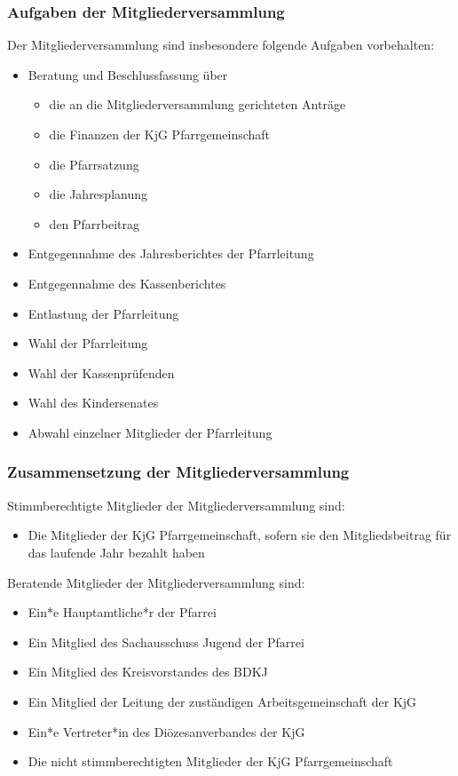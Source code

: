 \documentclass[12pt]{report}
\begin{document}
\begin{justify}
\subsubsection{Aufgaben der Mitgliederversammlung}
Der Mitgliederversammlung sind insbesondere folgende Aufgaben vorbehalten:
\begin{itemize}
  \item Beratung und Beschlussfassung über
    \begin{itemize}  
      \item die an die Mitgliederversammlung gerichteten Anträge
      \item die Finanzen der KjG Pfarrgemeinschaft
      \item die Pfarrsatzung
      \item die Jahresplanung
      \item den Pfarrbeitrag
    \end{itemize}
  \item Entgegennahme des Jahresberichtes der Pfarrleitung
  \item Entgegennahme des Kassenberichtes
  \item Entlastung der Pfarrleitung
  \item Wahl der Pfarrleitung
  \item Wahl der Kassenprüfenden
  \item Wahl des Kindersenates
  \item Abwahl einzelner Mitglieder der Pfarrleitung
\end{itemize}

\subsubsection{Zusammensetzung der Mitgliederversammlung}
Stimmberechtigte Mitglieder der Mitgliederversammlung sind:
\begin{itemize}
  \item Die Mitglieder der KjG Pfarrgemeinschaft, sofern sie den Mitgliedsbeitrag für das laufende Jahr bezahlt haben
\end{itemize}
Beratende Mitglieder der Mitgliederversammlung sind:
\begin{itemize}
  \item Ein*e Hauptamtliche*r der Pfarrei
  \item Ein Mitglied des Sachausschuss Jugend der Pfarrei
  \item Ein Mitglied des Kreisvorstandes des BDKJ
  \item Ein Mitglied der Leitung der zuständigen Arbeitsgemeinschaft der KjG
  \item Ein*e Vertreter*in des Diözesanverbandes der KjG
  \item Die nicht stimmberechtigten Mitglieder der KjG Pfarrgemeinschaft
\end{itemize}

\end{justify}
\end{document}
